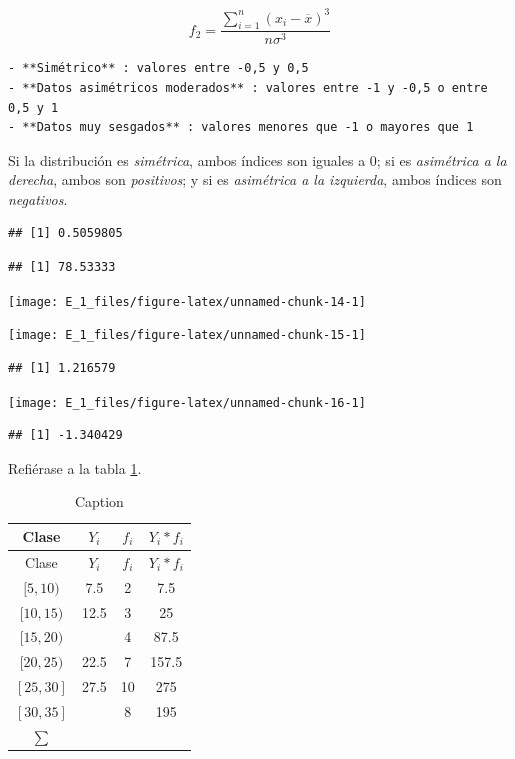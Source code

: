 \documentclass[10pt,]{krantz}
\theoremstyle{definition}
\theoremstyle{definition}
\theoremstyle{definition}
\theoremstyle{definition}
\theoremstyle{remark}
\begin{document}
\[f_2=\frac{\sum_{i=1}^{n}\left( x_i-\overline{x}\right)^3}{n\sigma^3}\]

\begin{verbatim}
- **Simétrico** : valores entre -0,5 y 0,5
- **Datos asimétricos moderados** : valores entre -1 y -0,5 o entre 0,5 y 1
- **Datos muy sesgados** : valores menores que -1 o mayores que 1
\end{verbatim}

Si la distribución es \emph{simétrica}, ambos índices son iguales a 0; si es \emph{asimétrica a la derecha}, ambos son \emph{positivos}; y si es \emph{asimétrica a la izquierda}, ambos índices son \emph{negativos}.

\begin{verbatim}
## [1] 0.5059805
\end{verbatim}

\begin{verbatim}
## [1] 78.53333
\end{verbatim}

\begin{center}\texttt{[image: E\_1\_files/figure-latex/unnamed-chunk-14-1]} \end{center}

\begin{center}\texttt{[image: E\_1\_files/figure-latex/unnamed-chunk-15-1]} \end{center}

\begin{verbatim}
## [1] 1.216579
\end{verbatim}

\begin{center}\texttt{[image: E\_1\_files/figure-latex/unnamed-chunk-16-1]} \end{center}

\begin{verbatim}
## [1] -1.340429
\end{verbatim}

Refiérase a la tabla \ref{tab:w1}.

\begin{longtable}[]{@{}cccc@{}}
\caption{\label{tab:w1} Caption}\tabularnewline
\toprule
Clase & \(Y_i\) & \(f_i\) & \(Y_i*f_i\)\tabularnewline
\midrule
\endfirsthead
\toprule
Clase & \(Y_i\) & \(f_i\) & \(Y_i*f_i\)\tabularnewline
\midrule
\endhead
\([5,10)\) & 7.5 & 2 & 7.5\tabularnewline
\([10,15)\) & 12.5 & 3 & 25\tabularnewline
\([15,20)\) & & 4 & 87.5\tabularnewline
\([20,25)\) & 22.5 & 7 & 157.5\tabularnewline
\([25,30]\) & 27.5 & 10 & 275\tabularnewline
\([30,35]\) & & 8 & 195\tabularnewline
\(\sum\) & & &\tabularnewline
\bottomrule
\end{longtable}
\end{document}
